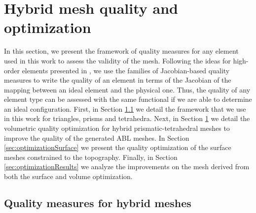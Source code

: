 \documentclass[1p]{elsarticle}
\begin{document}

\section{Hybrid mesh quality and optimization}
\label{sec:optimization}

In this section, we present the framework of quality measures for any element used in this work to assess the validity of the mesh. 
Following the ideas for high-order elements presented in \cite{gargallo:generation3Doptimization,AGPXRNJPGJSR:IMR13ewc}, we use the families of Jacobian-based quality measures to write the quality of an element in terms of the Jacobian of the mapping between an ideal element and the physical one. Thus, the quality of any element type can be assessed with the same functional if we are able to determine an ideal configuration.
First, in Section \ref{sec:qualityHybrid} we detail the framework that we use in this work for triangles, prisms and tetrahedra.
Next, in Section \ref{sec:optimization} we detail the volumetric quality optimization for hybrid prismatic-tetrahedral meshes to improve the quality of the generated ABL meshes.
In Section \ref{sec:optimizationSurface} we present the quality optimization of the surface meshes constrained to the topography.
Finally, in Section \ref{sec:optimizationResults} we analyze the improvements on the mesh derived from both the surface and volume optimization.

\subsection{Quality measures for hybrid meshes}
\label{sec:qualityHybrid}
\end{document}
